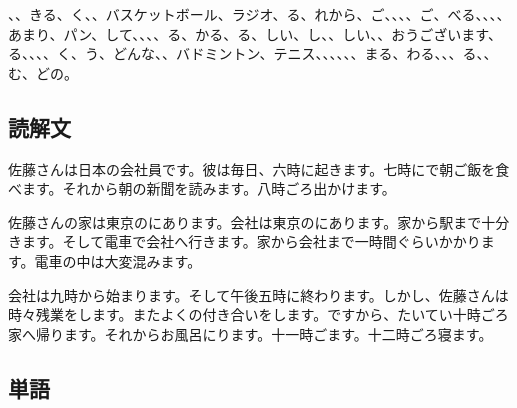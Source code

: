 \documentclass[a5j]{ltjtarticle}
\begin{document}
\begin{onehalfspace}
  、、きる、く、、バスケットボール、ラジオ、る、れから、ご、、、、ご、べる、、、、あまり、パン、して、、、、る、かる、る、しい、し、、しい、、おうございます、る、、、、く、う、どんな、、バドミントン、テニス、、、、、、まる、わる、、、る、、む、どの。
\end{onehalfspace}

\subsection*{読解文}

\noindent\hfil{}

佐藤さんは日本の会社員です。彼は毎日、六時に起きます。七時にで朝ご飯を食べます。それから朝の新聞を読みます。八時ごろ出かけます。

佐藤さんの家は東京のにあります。会社は東京のにあります。家から駅まで十分きます。そして電車で会社へ行きます。家から会社まで一時間ぐらいかかります。電車の中は大変混みます。

会社は九時から始まります。そして午後五時に終わります。しかし、佐藤さんは時々残業をします。またよくの付き合いをします。ですから、たいてい十時ごろ家へ帰ります。それからお風呂にります。十一時ごます。十二時ごろ寝ます。

\subsection*{単語}
\end{document}

